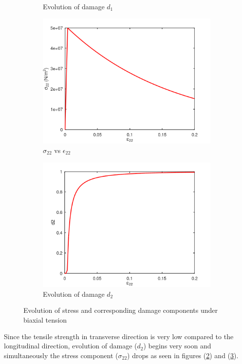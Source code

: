 \documentclass[a4paper,12pt]{extarticle}
\begin{document}
\begin{figure}[htbp]
\begin{subfigure}{0.45\textwidth}
         \caption{Evolution of damage $d_{1}$}
         \label{fig:Evolution of damage d1}
     \end{subfigure}
     \vfill
     \begin{subfigure}{0.45\textwidth}
         \centering
         \includegraphics[width=1.25\textwidth]{23.S22vsE22.png}
         \caption{$\sigma_{22}$ vs $\epsilon_{22}$}
         \label{fig:S22vsE22}
     \end{subfigure}
     \hfill
     \begin{subfigure}{0.45\textwidth}
         \centering
         \includegraphics[width=1.25\textwidth]{23.d2.png}
         \caption{Evolution of damage $d_{2}$}
         \label{fig:Evolution of damage d2}
     \end{subfigure}
     

        \caption{Evolution of stress and corresponding damage components under biaxial tension}
        \label{fig:Evolution of damage under biaxial tension}     
\end{figure} 
Since the tensile strength in transverse direction is very low compared to the longitudinal direction, evolution of damage ($d_{2}$) begins very soon and simultaneously the stress component ($\sigma_{22}$) drops as seen in figures (\ref{fig:S22vsE22}) and (\ref{fig:Evolution of damage d2}). \\
\end{document}
